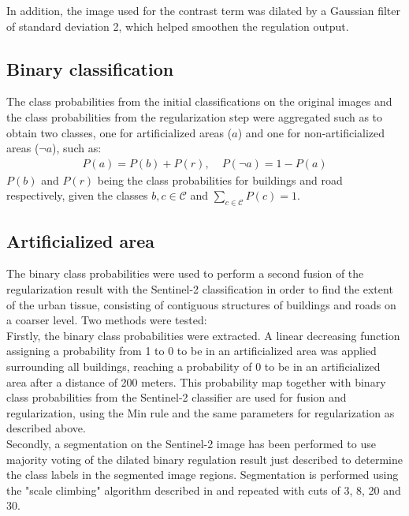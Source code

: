\documentclass[10pt]{article}
\begin{document}
In addition, the image used for the contrast term was dilated by a Gaussian filter of standard deviation 2, which helped smoothen the regulation output.

\subsection{Binary classification}
The class probabilities from the initial classifications on the original images and the class probabilities from the regularization step were aggregated such as to obtain two classes, one for artificialized areas ($a$) and one for non-artificialized areas ($\neg a$), such as:
\begin{align}
    P(a)=P(b)+P(r),  &\;P(\neg a)= 1 - P(a)
\end{align}
$P(b)$ and $P(r)$ being the class probabilities for buildings and road respectively, given the classes $b, c\in \mathcal{C}$  and $\sum_{c \in \mathcal{C}}P(c) = 1 $.

\subsection{Artificialized area}
The binary class probabilities were used to perform a second fusion of the regularization result with the Sentinel-2 classification in order to find the extent of the urban tissue, consisting of contiguous structures of buildings and roads on a coarser level. Two methods were tested:\\

Firstly, the binary class probabilities were extracted. A linear decreasing function assigning a probability from 1 to 0 to be in an artificialized area was applied surrounding all buildings, reaching a probability of 0 to be in an artificialized area after a distance of 200 meters.
This probability map together with binary class probabilities from the Sentinel-2 classifier are used for fusion and regularization, using the Min rule and the same parameters for regularization as described above.\\

Secondly, a segmentation on the Sentinel-2 image has been performed to use majority voting of the dilated binary regulation result just described to determine the class labels in the segmented image regions. Segmentation is performed using the "scale climbing" algorithm described in \cite{guigues_scale-sets_2003} and repeated with cuts of 3, 8, 20 and 30.
\end{document}
